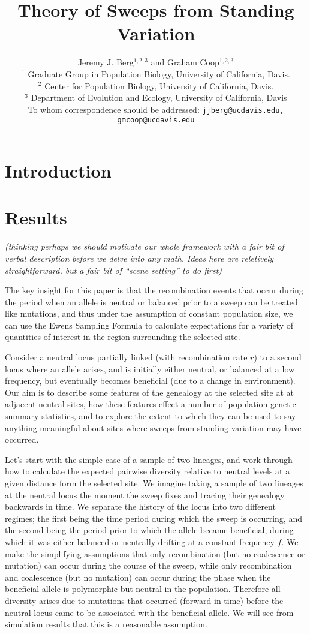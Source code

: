 \documentclass[a4paper,10pt]{article}
\title{Theory of Sweeps from Standing Variation}
\author{
Jeremy J. Berg$^{1,2,3}$ and Graham Coop$^{1,2,3}$ \\
$^1$ Graduate Group in Population Biology, University of California, Davis. \\
$^2$ Center for Population Biology, University of California, Davis.\\
$^3$ Department of Evolution and Ecology, University of California, Davis\\
\small To whom correspondence should be addressed: \texttt{jjberg@ucdavis.edu, gmcoop@ucdavis.edu}\\
}
\date{}
\newcommand{\jb}[1]{{\it\color{blue} (#1)} }
\begin{document}
\maketitle

\begin{abstract}
\end{abstract}

\section{Introduction}



\section{Results}
\jb{thinking perhaps we should motivate our whole framework with a fair bit of verbal description before we delve into any math. Ideas here are reletively straightforward, but a fair bit of ``scene setting'' to do first}

The key insight for this paper is that the recombination events that occur during the period when an allele is neutral or balanced prior to a sweep can be treated like mutations, and thus under the assumption of constant population size, we can use the Ewens Sampling Formula to calculate expectations for a variety of quantities of interest in the region surrounding the selected site.

Consider a neutral locus partially linked (with recombination rate $r$) to a second locus where an allele arises, and is initially either neutral, or balanced at a low frequency, but eventually becomes beneficial (due to a change in environment). Our aim is to describe some features of the genealogy at the selected site at at adjacent neutral sites, how these features effect a number of population genetic summary statistics, and to explore the extent to which they can be used to say anything meaningful about sites where sweeps from standing variation may have occurred. 

Let's start with the simple case of a sample of two lineages, and work through how to calculate the expected pairwise diversity relative to neutral levels at a given distance form the selected site. We imagine taking a sample of two lineages at the neutral locus the moment the sweep fixes and tracing their genealogy backwards in time. We separate the history of the locus into two different regimes; the first being the time period during which the sweep is occurring, and the second being the period prior to which the allele became beneficial, during which it was either balanced or neutrally drifting at a constant frequency $f$. We make the simplifying assumptions that only recombination (but no coalescence or mutation) can occur during the course of the sweep, while only recombination and coalescence (but no mutation) can occur during the phase when the beneficial allele is polymorphic but neutral in the population. Therefore all diversity arises due to mutations that occurred (forward in time) before the neutral locus came to be associated with the beneficial allele. We will see from simulation results that this is a reasonable assumption. 
\end{document}
